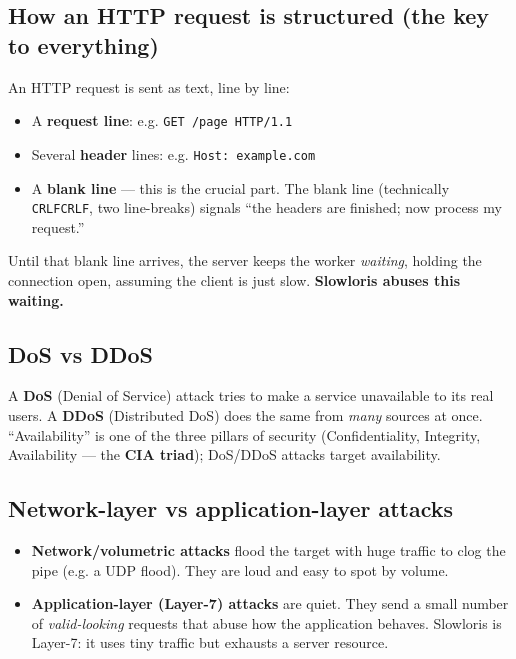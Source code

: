 \documentclass[11pt,a4paper]{article}
\newcommand{\term}[1]{\textbf{#1}}
\begin{document}
\subsection{How an HTTP request is structured (the key to everything)}
An HTTP request is sent as text, line by line:
\begin{itemize}
  \item A \term{request line}: e.g. \texttt{GET /page HTTP/1.1}
  \item Several \term{header} lines: e.g. \texttt{Host: example.com}
  \item A \textbf{blank line} --- this is the crucial part. The blank line
  (technically \texttt{CRLFCRLF}, two line-breaks) signals ``the headers are
  finished; now process my request.''
\end{itemize}
Until that blank line arrives, the server keeps the worker \emph{waiting}, holding
the connection open, assuming the client is just slow. \textbf{Slowloris abuses
this waiting.}

\subsection{DoS vs DDoS}
A \term{DoS} (Denial of Service) attack tries to make a service unavailable to its
real users. A \term{DDoS} (Distributed DoS) does the same from \emph{many} sources
at once. ``Availability'' is one of the three pillars of security (Confidentiality,
Integrity, Availability --- the \term{CIA triad}); DoS/DDoS attacks target
availability.

\subsection{Network-layer vs application-layer attacks}
\begin{itemize}
  \item \term{Network/volumetric attacks} flood the target with huge traffic to
  clog the pipe (e.g. a UDP flood). They are loud and easy to spot by volume.
  \item \term{Application-layer (Layer-7) attacks} are quiet. They send a small
  number of \emph{valid-looking} requests that abuse how the application behaves.
  Slowloris is Layer-7: it uses tiny traffic but exhausts a server resource.
\end{itemize}
\end{document}
